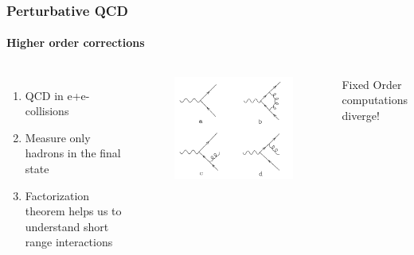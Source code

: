 \documentclass[aspectratio=43]{beamer}
\begin{document}
\begin{frame}

	\frametitle{Perturbative QCD}
	\framesubtitle{Higher order corrections}
	\begin{columns}
	
	
	\begin{enumerate}
		\item QCD in e+e- collisions
		\item Measure only hadrons in the final state
		\item Factorization theorem helps us to understand short range interactions
	\end{enumerate}
	
	\begin{figure}[!htb]
		\includegraphics[width = \linewidth]{plots/qcd_corrections.png}
	\end{figure}
	
	Fixed Order computations diverge!
	
\end{columns}

\end{frame}

\begin{frame}


\end{frame}
\end{document}
